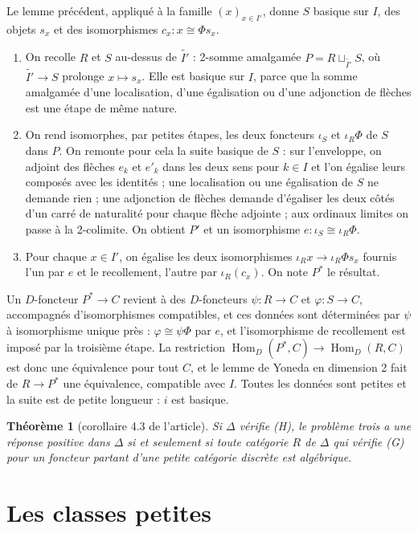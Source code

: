 \documentclass[11pt,a4paper]{amsart}
\theoremstyle{definition}
\theoremstyle{plain}
\newtheorem{theoreme}{Théorème}
\theoremstyle{remark}
\newcommand{\Hom}{\operatorname{Hom}}
\begin{document}
Le lemme précédent, appliqué à la famille $(x)_{x\in I'}$, donne $S$ basique sur $I$, des objets $s_x$ et des isomorphismes $c_x\colon x\cong\Phi s_x$.
\begin{enumerate}
\item On recolle $R$ et $S$ au-dessus de $\widetilde{I'}$ : 2-somme amalgamée $P=R\sqcup_{\widetilde{I'}}S$, où $\widetilde{I'}\to S$ prolonge $x\mapsto s_x$. Elle est basique sur $I$, parce que la somme amalgamée d'une localisation, d'une égalisation ou d'une adjonction de flèches est une étape de même nature.
\item On rend isomorphes, par petites étapes, les deux foncteurs $\iota_S$ et $\iota_R\Phi$ de $S$ dans $P$. On remonte pour cela la suite basique de $S$ : sur l'enveloppe, on adjoint des flèches $e_k$ et $e'_k$ dans les deux sens pour $k\in I$ et l'on égalise leurs composés avec les identités ; une localisation ou une égalisation de $S$ ne demande rien ; une adjonction de flèches demande d'égaliser les deux côtés d'un carré de naturalité pour chaque flèche adjointe ; aux ordinaux limites on passe à la 2-colimite. On obtient $P'$ et un isomorphisme $e\colon\iota_S\cong\iota_R\Phi$.
\item Pour chaque $x\in I'$, on égalise les deux isomorphismes $\iota_Rx\to\iota_R\Phi s_x$ fournis l'un par $e$ et le recollement, l'autre par $\iota_R(c_x)$. On note $P^*$ le résultat.
\end{enumerate}
Un $D$-foncteur $P^*\to C$ revient à des $D$-foncteurs $\psi\colon R\to C$ et $\varphi\colon S\to C$, accompagnés d'isomorphismes compatibles, et ces données sont déterminées par $\psi$ à isomorphisme unique près : $\varphi\cong\psi\Phi$ par $e$, et l'isomorphisme de recollement est imposé par la troisième étape. La restriction $\Hom_D(P^*,C)\to\Hom_D(R,C)$ est donc une équivalence pour tout $C$, et le lemme de Yoneda en dimension 2 fait de $R\to P^*$ une équivalence, compatible avec $I$. Toutes les données sont petites et la suite est de petite longueur : $i$ est basique.

\begin{theoreme}[corollaire 4.3 de l'article]
Si $\Delta$ vérifie (H), le problème trois a une réponse positive dans $\Delta$ si et seulement si toute catégorie $R$ de $\Delta$ qui vérifie (G) pour un foncteur partant d'une petite catégorie discrète est algébrique.
\end{theoreme}

\section{Les classes petites}
\end{document}
